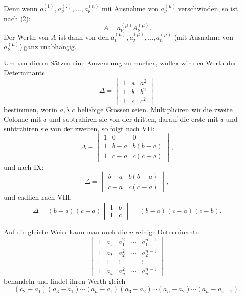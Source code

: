 

Denn wenn \(a_\nu^{(1)},a_\nu^{(2)},\ldots,a_\nu^{(n)}\) mit Ausnahme von \(a_\nu^{(\mu)}\) verschwinden, so ist nach (2):
\[
A=a_\nu^{(\mu)}A_\nu^{(\mu)}.
\]
Der Werth von \(A\) ist dann von den \(a_1^{(\mu)},a_2^{(\mu)},\ldots,a_n^{(\mu)}\) (mit Ausnahme von \(a_\nu^{(\mu)}\)) ganz unabhängig.

Um von diesen Sätzen eine Anwendung zu machen, wollen wir den Werth der Determinante
\[
\Delta=
\begin{vmatrix}
1&a&a^2\\
1&b&b^2\\
1&c&c^2
\end{vmatrix}
\]
bestimmen, worin \(a,b,c\) beliebige Grössen seien. Multipliciren wir die zweite Colonne mit \(a\) und subtrahiren sie von der dritten, darauf die erste mit \(a\) und subtrahiren sie von der zweiten, so folgt nach VII:
\[
\Delta=
\begin{vmatrix}
1&0&0\\
1&b-a&b(b-a)\\
1&c-a&c(c-a)
\end{vmatrix},
\]
und nach IX:
\[
\Delta=
\begin{vmatrix}
b-a&b(b-a)\\
c-a&c(c-a)
\end{vmatrix},
\]
und endlich nach VIII:
\begin{equation}
\Delta=(b-a)(c-a)
\begin{vmatrix}
1&b\\
1&c
\end{vmatrix}
=(b-a)(c-a)(c-b).
\tag{10}
\end{equation}

Auf die gleiche Weise kann man auch die \(n\)-reihige Determinante
\[
\begin{vmatrix}
1&a_1&a_1^2&\cdots&a_1^{n-1}\\
1&a_2&a_2^2&\cdots&a_2^{n-1}\\
\vdots&\vdots&\vdots&&\vdots\\
1&a_n&a_n^2&\cdots&a_n^{n-1}
\end{vmatrix}
\]
behandeln und findet ihren Werth gleich
\begin{equation}
(a_2-a_1)(a_3-a_1)\cdots(a_n-a_1)
(a_3-a_2)\cdots(a_n-a_2)\cdots(a_n-a_{n-1}).
\tag{11}
\end{equation}
